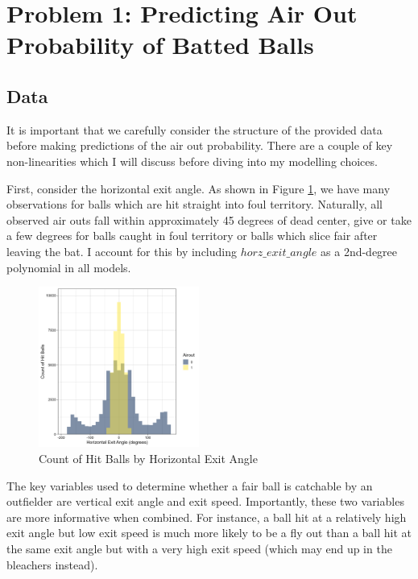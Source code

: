
\section*{Problem 1: Predicting Air Out Probability of Batted Balls}
\label{sec:p1}

\subsection{Data}
\label{subsec:data}

It is important that we carefully consider the structure of the provided data before making predictions of the air out probability. There are a couple of key non-linearities which I will discuss before diving into my modelling choices.

First, consider the horizontal exit angle. As shown in Figure \ref{fig:hist}, we have many observations for balls which are hit straight into foul territory. Naturally, all observed air outs fall within approximately 45 degrees of dead center, give or take a few degrees for balls caught in foul territory or balls which slice fair after leaving the bat. I account for this by including $horz\_exit\_angle$ as a 2nd-degree polynomial in all models.

\begin{figure}[htb]
  \includegraphics[width = 0.47\textwidth]{../../output/figs/horz_exit_angle_hist.png}
  \caption{Count of Hit Balls by Horizontal Exit Angle}
  \label{fig:hist}
\end{figure}

The key variables used to determine whether a fair ball is catchable by an outfielder are vertical exit angle and exit speed. Importantly, these two variables are more informative when combined. For instance, a ball hit at a relatively high exit angle but low exit speed is much more likely to be a fly out than a ball hit at the same exit angle but with a very high exit speed (which may end up in the bleachers instead).

